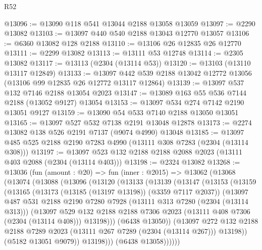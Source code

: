 \begin{lexlean}{R52}
\begin{coremodule}
@13096 := @13090 @118 @541 @13044 @2188 @13058 @13059
@13097 := @2290 @13082
@13103 := @13097 @440 @540 @2188 @13043 @12770 @13057
@13106 := @6360 @13082 @128 @2188
@13110 := @13106 @26 @12835 @26 @12770
@13111 := @2299 @13082
@13113 := @13111 @53 @12748
@13114 := @2305 @13082
@13117 := @13113 (@2304 (@13114 @53))
@13120 := @13103 (@13110 @13117 @12849)
@13133 := @13097 @442 @539 @2188 @13042 @12772 @13056 (@13106 @99 @12835 @26 @12772 @13117 @12864)
@13139 := @13097 @537 @132 @7146 @2188 @13054 @2023
@13147 := @13089 @163 @55 @536 @7144 @2188 (@13052 @9127) @13054
@13153 := @13097 @534 @274 @7142 @2190 @13051 @9127
@13159 := @13090 @54 @533 @7140 @2188 @13050 @13051
@13165 := @13097 @527 @532 @7138 @2191 @13048 @12878
@13173 := @2274 @13082 @138 @526 @2191 @7137 (@9074 @4990) @13048
@13185 := @13097 @485 @525 @2188 @2190 @7283 @4990 (@13111 @308 @7283 (@2304 (@13114 @308)))
@13197 := @13097 @523 @132 @2188 @2188 @2088 @2023 (@13111 @403 @2088 (@2304 (@13114 @403)))
@13198 := @2324 @13082
@13268 := @13036
    (fun (amount : @20) =>
    fun (inner : @2015) =>
    @13062
      (@13068
        (@13074
          (@13088
            (@13096
              (@13120
                (@13133
                  (@13139
                    (@13147
                      (@13153
                        (@13159
                          (@13165
                            (@13173 (@13185 (@13197 @13198)) (@3359 @7117 @2037))
                            (@13097
                              @487
                              @531
                              @2188
                              @2190
                              @7280
                              @7928
                              (@13111 @313 @7280 (@2304 (@13114 @313)))
                              (@13097
                                @529
                                @132
                                @2188
                                @2188
                                @7306
                                @2023
                                (@13111 @408 @7306 (@2304 (@13114 @408)))
                                @13198)))
                          (@6438 @13050))
                        (@13097
                          @272
                          @132
                          @2188
                          @2188
                          @7289
                          @2023
                          (@13111 @267 @7289 (@2304 (@13114 @267)))
                          @13198))
                      (@5182 @13051 @9079))
                    @13198)))
              (@6438 @13058))))))

\end{coremodule}
\end{lexlean}
